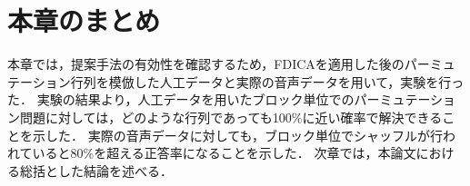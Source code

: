 \clearpage
\section{本章のまとめ}
\label{sec:matome}
本章では，提案手法の有効性を確認するため，FDICAを適用した後のパーミュテーション行列を模倣した人工データと実際の音声データを用いて，実験を行った．
実験の結果より，人工データを用いたブロック単位でのパーミュテーション問題に対しては，どのような行列であっても100\%に近い確率で解決できることを示した．
実際の音声データに対しても，ブロック単位でシャッフルが行われていると80\%を超える正答率になることを示した．
次章では，本論文における総括とした結論を述べる．
